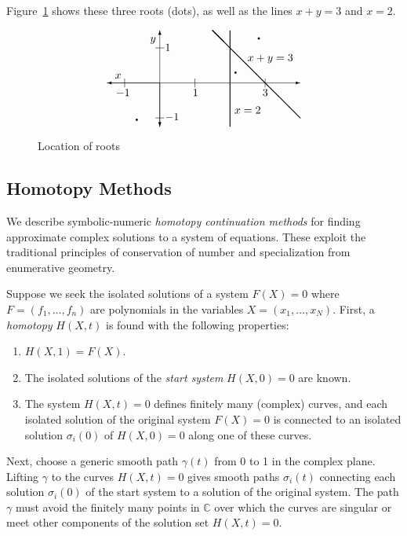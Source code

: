 \begin{example}
Figure~\ref{fig:roots} shows these three roots (dots), as well as the
lines $x+y=3$ and $x=2$.
\begin{figure}
$$
  \setlength{\unitlength}{0.8pt}
  \begin{picture}(220,110)(-60,-50)
   \put(0,-50){\vector(0,1){110}} \put(0,0){\vector(0,-1){50}}
   \put(-11,47){$y$}
   \put(-5,-40){\line(1,0){10}} \put(6,-42.8){$-1$}
   \put(-5,40){\line(1,0){10}}  \put(6, 36.5){$1$}
   \put(-60,0){\vector(1,0){220}} \put(0,0){\vector(-1,0){60}}
   \put(-40,-5){\line(0,1){10}} \put(-50,-15){$-1$}
   \put(40,-5){\line(0,1){10}}  \put(37.5,-15){$1$}
   \put(120,-5){\line(0,1){10}} \put(117,-15){$3$}
   \put(-51,5){$x$}
  
  \thicklines
  \put(80,-50){\line(0,1){110}}  \put(85,-35){$x=2$}
  \put(160,-40){\line(-1,1){100}}%
  \put(100,25){$x+y=3$}
  
  \put(-26.2, -42.1){\circle*{2}}
  \put(86.3, 11.8){\circle*{2}}
  \put(112.8, 50.8){\circle*{2}}
  \end{picture}
$$
\caption{Location of roots\label{fig:roots}}
\end{figure}
\end{example}


\subsection{Homotopy Methods}
We describe symbolic-numeric 
{\it homotopy continuation methods} 
for finding approximate complex solutions to a system of
equations.
These exploit the traditional principles of conservation of number and 
specialization from enumerative geometry.

Suppose we seek the isolated solutions of a system $F(X)=0$
where $F=(f_1,\ldots,f_n)$ are polynomials in the variables
$X=(x_1,\ldots,x_N)$.
First, a {\em homotopy} $H(X,t)$ is found with the following properties:
\begin{enumerate}
  \item $H(X,1)= F(X)$. 
  \item The isolated solutions of the {\it start system} $H(X,0)=0$ are known.
  \item The system $H(X,t)=0$ defines finitely many (complex) curves, 
        and each isolated solution of the original system $F(X)=0$ is
        connected to an isolated solution $\sigma_i(0)$ of $H(X,0)=0$ along
        one of these curves. 
\end{enumerate}
Next, choose a generic smooth path $\gamma(t)$ from 0 to 1 in the complex
plane.
Lifting $\gamma$ to the curves $H(X,t)=0$ gives 
smooth paths $\sigma_i(t)$ connecting each solution
$\sigma_i(0)$ of the start system to a solution of the original system.
The path $\gamma$ must avoid the finitely many points in ${\mathbb C}$ over
which the curves are singular or meet other components of the solution set
$H(X,t)=0$.

